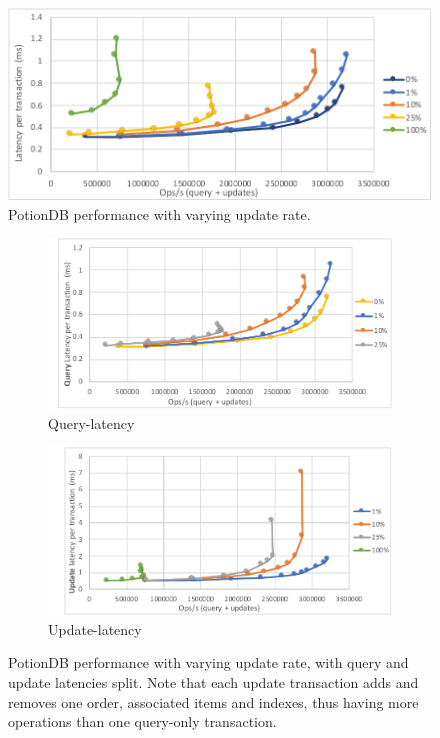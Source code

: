 \documentclass{vldb}
\begin{document}
\begin{figure}
	\centering
	\includegraphics[width=.95\linewidth]{updRate_global_cut}
	\caption{PotionDB performance with varying update rate.}
	\label{fig:update_rates}
\end{figure}
\begin{figure}
	\centering
	\begin{subfigure}{.5\linewidth}
		\centering
		\includegraphics[width=.97\linewidth]{updRate_queryLatency_cut}
		\caption{Query-latency}
		\label{fig:update_rates_query}
	\end{subfigure}%
	\begin{subfigure}{.5\linewidth}
		\centering
		\includegraphics[width=.97\linewidth]{updRate_updateLatency_cut}
		\caption{Update-latency}
		\label{fig:update_rates_update}
	\end{subfigure}
	\caption{PotionDB performance with varying update rate, with query and update latencies split. Note that each update transaction adds and removes one order, associated items and indexes, thus having more operations than one query-only transaction.}
	\label{fig:update_rates_split}
\end{figure}
\end{document}
